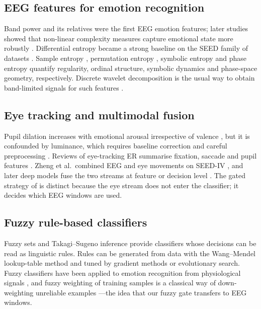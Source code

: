 \documentclass[10pt,twoside]{article}
\begin{document}
\subsection{EEG features for emotion recognition}
Band power and its relatives were the first EEG emotion features; later studies showed that non-linear complexity measures capture emotional state more robustly \cite{Jenke2014}. Differential entropy became a strong baseline on the SEED family of datasets \cite{Duan2013,ZhengLu2015}. Sample entropy \cite{Richman2000}, permutation entropy \cite{Bandt2002}, symbolic entropy \cite{Zebrowski2000} and phase entropy \cite{Rohila2019} quantify regularity, ordinal structure, symbolic dynamics and phase-space geometry, respectively. Discrete wavelet decomposition is the usual way to obtain band-limited signals for such features \cite{Mallat1989,Murugappan2010}.

\subsection{Eye tracking and multimodal fusion}
Pupil dilation increases with emotional arousal irrespective of valence \cite{Bradley2008,Partala2003}, but it is confounded by luminance, which requires baseline correction and careful preprocessing \cite{Kret2019,Mathot2018,Raiturkar2016}. Reviews of eye-tracking ER summarise fixation, saccade and pupil features \cite{Lim2020}. Zheng et al.\ combined EEG and eye movements on SEED-IV \cite{ZhengDong2014,Zheng2019}, and later deep models fuse the two streams at feature or decision level \cite{Liu2022,Fu2023}. The gated strategy of \cite{FarhadiSedehi2024a,FarhadiSedehi2024b} is distinct because the eye stream does not enter the classifier; it decides which EEG windows are used.

\subsection{Fuzzy rule-based classifiers}
Fuzzy sets \cite{Zadeh1965} and Takagi--Sugeno inference \cite{TakagiSugeno1985} provide classifiers whose decisions can be read as linguistic rules. Rules can be generated from data with the Wang--Mendel lookup-table method \cite{WangMendel1992} and tuned by gradient methods \cite{Jang1993} or evolutionary search. Fuzzy classifiers have been applied to emotion recognition from physiological signals \cite{Matiko2014,Kaya2024}, and fuzzy weighting of training samples is a classical way of down-weighting unreliable examples \cite{LinWang2002}---the idea that our fuzzy gate transfers to EEG windows.
\end{document}
